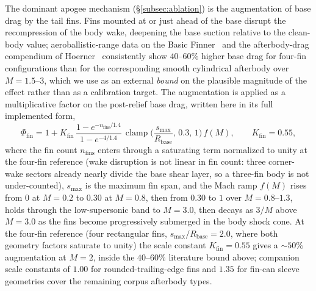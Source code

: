The dominant apogee mechanism (\S\ref{subsec:ablation}) is the augmentation of
base drag by the tail fins. Fins mounted at or just ahead of the base disrupt the
recompression of the body wake, deepening the base suction relative to the
clean-body value; aeroballistic-range data on the Basic Finner~\cite{dupuis1997}
and the afterbody-drag compendium of Hoerner~\cite{hoerner1965} consistently show
$40$--$60\%$ higher base drag for four-fin configurations than for the
corresponding smooth cylindrical afterbody over $M = 1.5$--$3$, which we use as an
external \emph{bound} on the plausible magnitude of the effect rather than as a
calibration target. The augmentation is applied as a multiplicative factor on the
post-relief base drag, written here in its full implemented form,
%
\begin{equation}
\Phi_{\text{fin}} = 1 + K_{\text{fin}}\,
   \frac{1 - e^{-n_{\text{fins}}/1.4}}{1 - e^{-4/1.4}}\,
   \operatorname{clamp}\!\Big(\frac{s_{\max}}{R_{\text{base}}},\,0.3,\,1\Big)\,
   f(M) ,
\qquad K_{\text{fin}} = 0.55 ,
\label{eq:finnedbase}
\end{equation}
%
where the fin count $n_{\text{fins}}$ enters through a saturating term normalized
to unity at the four-fin reference (wake disruption is not linear in fin count:
three corner-wake sectors already nearly divide the base shear layer, so a
three-fin body is not under-counted), $s_{\max}$ is the maximum fin span, and the
Mach ramp $f(M)$ rises from $0$ at $M = 0.2$ to $0.30$ at $M = 0.8$, then from
$0.30$ to $1$ over $M = 0.8$--$1.3$, holds through the low-supersonic band to
$M = 3.0$, then decays as $3/M$ above $M = 3.0$ as the fins become progressively
submerged in the body shock cone. At the four-fin reference (four rectangular
fins, $s_{\max}/R_{\text{base}} = 2.0$, where both geometry factors saturate to
unity) the scale constant $K_{\text{fin}} = 0.55$ gives a $\sim\!50\%$
augmentation at $M = 2$, inside the $40$--$60\%$ literature bound above; companion
scale constants of $1.00$ for rounded-trailing-edge fins and $1.35$ for fin-can
sleeve geometries cover the remaining corpus afterbody types.

